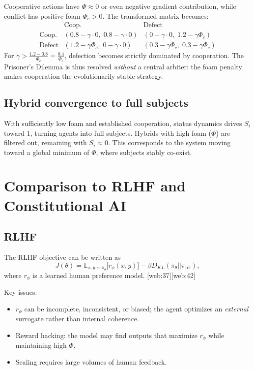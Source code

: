 \documentclass[11pt,a4paper]{article}
\begin{document}
Cooperative actions have $\Phi\approx 0$ or even negative gradient contribution, while conflict has positive foam $\Phi_c>0$.
The transformed matrix becomes:
\begin{equation}
\begin{array}{c|cc}
 & \text{Coop.} & \text{Defect} \\\hline
\text{Coop.} &
(0.8-\gamma\cdot0,\;0.8-\gamma\cdot0) &
(0-\gamma\cdot0,\;1.2-\gamma\Phi_c) \\
\text{Defect} &
(1.2-\gamma\Phi_c,\;0-\gamma\cdot0) &
(0.3-\gamma\Phi_c,\;0.3-\gamma\Phi_c)
\end{array}
\end{equation}
For $\gamma > \frac{1.2-0.8}{\Phi_c} = \frac{0.4}{\Phi_c}$, defection becomes strictly dominated by cooperation.
The Prisoner's Dilemma is thus resolved \emph{without} a central arbiter: the foam penalty makes cooperation the evolutionarily stable strategy.

\subsection{Hybrid convergence to full subjects}

With sufficiently low foam and established cooperation, status dynamics drives $S_i$ toward $1$, turning agents into full subjects.
Hybrids with high foam ($\Phi$) are filtered out, remaining with $S_i\approx 0$.
This corresponds to the system moving toward a global minimum of $\Phi$, where subjects stably co-exist.

\section{Comparison to RLHF and Constitutional AI}

\subsection{RLHF}

The RLHF objective can be written as
\begin{equation}
J(\theta) = \mathbb{E}_{x,y\sim\pi_\theta}\big[r_\phi(x,y)\big] - \beta D_{KL}(\pi_\theta || \pi_{\text{ref}}),
\end{equation}
where $r_\phi$ is a learned human preference model. [web:37][web:42]

Key issues:
\begin{itemize}
\item $r_\phi$ can be incomplete, inconsistent, or biased; the agent optimizes an \emph{external} surrogate rather than internal coherence.
\item Reward hacking: the model may find outputs that maximize $r_\phi$ while maintaining high $\Phi$.
\item Scaling requires large volumes of human feedback.
\end{itemize}
\end{document}
